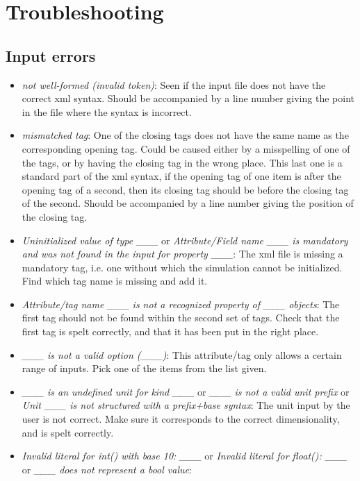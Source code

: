 \documentclass[11pt,english,fleqn]{report}
\begin{document}
\chapter{Troubleshooting}

\label{trouble}


\section{Input errors}
\begin{itemize}
\item \emph{not well-formed (invalid token)}: Seen if the input file does
not have the correct xml syntax. Should be accompanied by a line number
giving the point in the file where the syntax is incorrect.
\item \emph{mismatched tag}: One of the closing tags does not have the
same name as the corresponding opening tag. Could be caused either
by a misspelling of one of the tags, or by having the closing tag
in the wrong place. This last one is a standard part of the xml syntax,
if the opening tag of one item is after the opening tag of a second,
then its closing tag should be before the closing tag of the second.
Should be accompanied by a line number giving the position of the
closing tag.
\item \emph{Uninitialized value of type \_\_\_} or \emph{Attribute/Field name \_\_\_ is mandatory and was not found in the input for property \_\_\_}:
The xml file is missing a mandatory tag, i.e. one without which the
simulation cannot be initialized. Find which tag name is missing and
add it.
\item \emph{Attribute/tag name \_\_\_ is not a recognized property of \_\_\_ objects}:
The first tag should not be found within the second set of tags. Check
that the first tag is spelt correctly, and that it has been put in
the right place.
\item \emph{\_\_\_ is not a valid option (\_\_\_)}: This attribute/tag
only allows a certain range of inputs. Pick one of the items from
the list given.
\item \emph{\_\_\_ is an undefined unit for kind \_\_\_} or \emph{\_\_\_ is not a valid unit prefix} or \emph{Unit \_\_\_ is not structured with a prefix+base syntax}:
The unit input by the user is not correct. Make sure it corresponds
to the correct dimensionality, and is spelt correctly.
\item \emph{Invalid literal for int() with base 10: \_\_\_} or \emph{Invalid literal for float(): \_\_\_} or \emph{\_\_\_ does not represent a bool value}:

\end{itemize}
\end{document}

